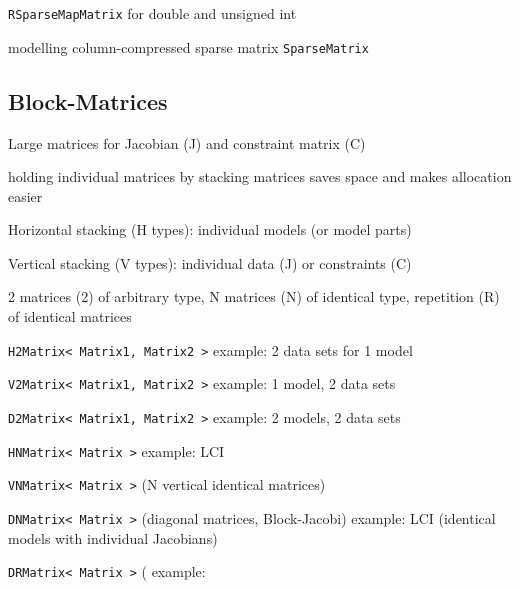\lstinline|RSparseMapMatrix| for double and unsigned int

modelling column-compressed sparse matrix \lstinline|SparseMatrix|

\subsection{Block-Matrices}
Large matrices for Jacobian (J) and constraint matrix (C)

holding individual matrices by stacking matrices saves space and makes allocation easier

Horizontal stacking (H types): individual models (or model parts)

Vertical stacking (V types): individual data (J) or constraints (C)

2 matrices (2) of arbitrary type, N matrices (N) of identical type, repetition (R) of identical matrices

\lstinline|H2Matrix< Matrix1, Matrix2 >|
example: 2 data sets for 1 model

\lstinline|V2Matrix< Matrix1, Matrix2 >| example: 1 model, 2 data sets

\lstinline|D2Matrix< Matrix1, Matrix2 >| example: 2 models, 2 data sets

\lstinline|HNMatrix< Matrix >| example: LCI 

\lstinline|VNMatrix< Matrix >| (N vertical identical matrices)

\lstinline|DNMatrix< Matrix >| (diagonal matrices, Block-Jacobi)
example: LCI (identical models with individual Jacobians)

\lstinline|DRMatrix< Matrix >| (
example: 